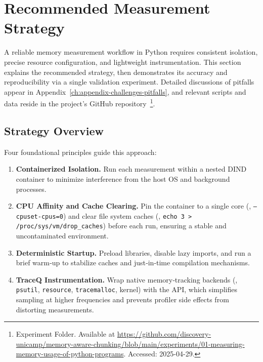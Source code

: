 \section{Recommended Measurement Strategy}
\label{sec:mmc-recommended-strategy}

A reliable memory measurement workflow in Python requires consistent isolation, precise resource configuration, and lightweight instrumentation.
This section explains the recommended strategy, then demonstrates its accuracy and reproducibility via a single validation experiment.
Detailed discussions of pitfalls appear in Appendix~\ref{ch:appendix-challenges-pitfalls}, and relevant scripts and data reside in the project’s GitHub repository~\footnote{Experiment Folder. Available at \url{https://github.com/discovery-unicamp/memory-aware-chunking/blob/main/experiments/01-measuring-memory-usage-of-python-programs}. Accessed: 2025-04-29.}.

\subsection{Strategy Overview}
\label{subsec:strategy-overview}

Four foundational principles guide this approach:

\begin{enumerate}

    \item \textbf{Containerized Isolation.} Run each measurement within a nested \ac{DIND} container to minimize interference from the host \ac{OS} and background processes.

    \item \textbf{\ac{CPU} Affinity and Cache Clearing.} Pin the container to a single core (\eg, \texttt{--cpuset-cpus=0}) and clear file system caches (\eg, \texttt{echo 3 > /proc/sys/vm/drop\_caches}) before each run, ensuring a stable and uncontaminated environment.

    \item \textbf{Deterministic Startup.} Preload libraries, disable lazy imports, and run a brief warm‑up to stabilize caches and just‑in‑time compilation mechanisms.

    \item \textbf{TraceQ Instrumentation.} Wrap native memory‑tracking backends (\eg, \texttt{psutil}, \texttt{resource}, \texttt{tracemalloc}, kernel) with the \traceq \ac{API}, which simplifies sampling at higher frequencies and prevents profiler side effects from distorting measurements.

\end{enumerate}

